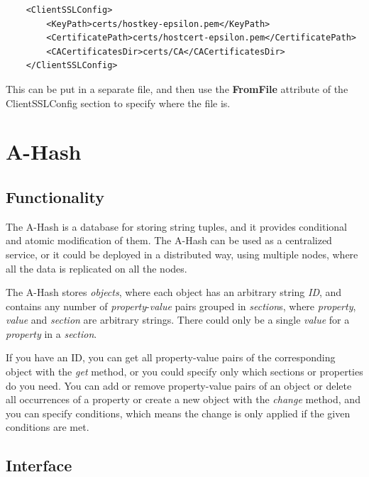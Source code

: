 \documentclass{book}
\begin{document}
\begin{verbatim}
    <ClientSSLConfig>
        <KeyPath>certs/hostkey-epsilon.pem</KeyPath>
        <CertificatePath>certs/hostcert-epsilon.pem</CertificatePath>
        <CACertificatesDir>certs/CA</CACertificatesDir>
    </ClientSSLConfig>
\end{verbatim}

This can be put in a separate file, and then use the \textbf{FromFile} attribute of the ClientSSLConfig section to specify where the file is.


\newpage

\section{A-Hash} %
\label{sec:a_hash}

\subsection{Functionality} %

The A-Hash is a database for storing string tuples, and it provides conditional and atomic modification of them. The A-Hash can be used as a centralized service, or it could be deployed in a distributed way, using multiple nodes, where all the data is replicated on all the nodes.

The A-Hash stores \emph{objects}, where each object has an arbitrary string \emph{ID}, and contains any number of \emph{property}-\emph{value} pairs grouped in \emph{section}s, where \emph{property}, \emph{value} and \emph{section} are arbitrary strings. There could only be a single \emph{value} for a \emph{property} in a \emph{section}.

If you have an ID, you can get all property-value pairs of the corresponding object with the \emph{get} method, or you could specify only which sections or properties do you need. You can add or remove property-value pairs of an object or delete all occurrences of a property or create a new object with the \emph{change} method, and you can specify conditions, which means the change is only applied if the given conditions are met.


\subsection{Interface} %
\end{document}
